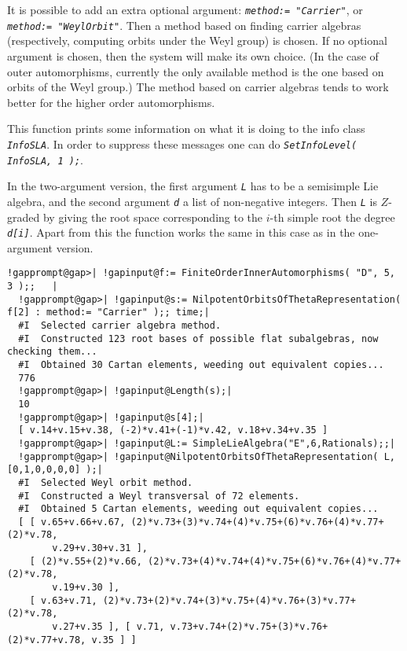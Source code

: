 \documentclass[a4paper,11pt]{report}
\begin{document}
{{{ It is possible to add an extra optional argument: \mbox{\texttt{\mdseries\slshape method:= "Carrier"}}, or \mbox{\texttt{\mdseries\slshape method:= "WeylOrbit"}}. Then a method based on finding carrier algebras (respectively, computing
orbits under the Weyl group) is chosen. If no optional argument is chosen,
then the system will make its own choice. (In the case of outer automorphisms,
currently the only available method is the one based on orbits of the Weyl
group.) The method based on carrier algebras tends to work better for the
higher order automorphisms. 

 This function prints some information on what it is doing to the info class \mbox{\texttt{\mdseries\slshape InfoSLA}}. In order to suppress these messages one can do \mbox{\texttt{\mdseries\slshape SetInfoLevel( InfoSLA, 1 );}}. 

 In the two-argument version, the first argument \mbox{\texttt{\mdseries\slshape L}} has to be a semisimple Lie algebra, and the second argument \mbox{\texttt{\mdseries\slshape d}} a list of non-negative integers. Then \mbox{\texttt{\mdseries\slshape L}} is $Z$-graded by giving the root space corresponding to the $i$-th simple root the degree \mbox{\texttt{\mdseries\slshape d[i]}}. Apart from this the function works the same in this case as in the
one-argument version. 
\begin{Verbatim}[commandchars=!@|,fontsize=\small,frame=single,label=Example]
  !gapprompt@gap>| !gapinput@f:= FiniteOrderInnerAutomorphisms( "D", 5, 3 );;   |
  !gapprompt@gap>| !gapinput@s:= NilpotentOrbitsOfThetaRepresentation( f[2] : method:= "Carrier" );; time;|
  #I  Selected carrier algebra method.
  #I  Constructed 123 root bases of possible flat subalgebras, now checking them...
  #I  Obtained 30 Cartan elements, weeding out equivalent copies...
  776
  !gapprompt@gap>| !gapinput@Length(s);|
  10
  !gapprompt@gap>| !gapinput@s[4];|
  [ v.14+v.15+v.38, (-2)*v.41+(-1)*v.42, v.18+v.34+v.35 ]
  !gapprompt@gap>| !gapinput@L:= SimpleLieAlgebra("E",6,Rationals);;|
  !gapprompt@gap>| !gapinput@NilpotentOrbitsOfThetaRepresentation( L, [0,1,0,0,0,0] );|
  #I  Selected Weyl orbit method.
  #I  Constructed a Weyl transversal of 72 elements.
  #I  Obtained 5 Cartan elements, weeding out equivalent copies...
  [ [ v.65+v.66+v.67, (2)*v.73+(3)*v.74+(4)*v.75+(6)*v.76+(4)*v.77+(2)*v.78, 
        v.29+v.30+v.31 ], 
    [ (2)*v.55+(2)*v.66, (2)*v.73+(4)*v.74+(4)*v.75+(6)*v.76+(4)*v.77+(2)*v.78, 
        v.19+v.30 ], 
    [ v.63+v.71, (2)*v.73+(2)*v.74+(3)*v.75+(4)*v.76+(3)*v.77+(2)*v.78, 
        v.27+v.35 ], [ v.71, v.73+v.74+(2)*v.75+(3)*v.76+(2)*v.77+v.78, v.35 ] ]
\end{Verbatim}
 }

}}
\end{document}
